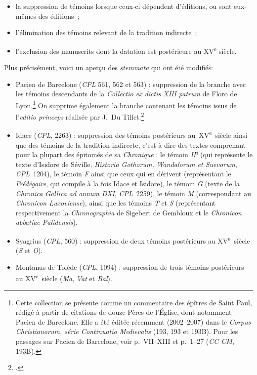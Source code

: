 \documentclass[a4paper,twoside,12pt]{book}
\begin{document}
	\begin{itemize}
		\item la suppression de témoins lorsque ceux-ci dépendent d’éditions, ou sont eux-mêmes des éditions~;
		\item l’élimination des témoins relevant de la tradition indirecte~;
		\item l’exclusion des manuscrits dont la datation est postérieure au XV\textsuperscript{e} siècle. \\
	\end{itemize}
	
	Plus précisément, voici un aperçu des \textit{stemmata} qui ont été modifiés:
	
	\begin{itemize}
		
		\item Pacien de Barcelone (\textit{CPL} 561, 562 et 563) : suppression de la branche avec les témoins descendants de la \textit{Collectio ex dictis XIII patrum} de Floro de Lyon.\footnote{Cette collection se présente comme un commentaire des épîtres de Saint Paul, rédigé à partir de citations de douze Pères de l'Église, dont notamment Pacien de Barcelone. Elle a été éditée récemment (2002--2007) dans le \textit{Corpus Christianorum, série Continuatio Medievalis} (193, 193 et 193B). Pour les passages sur Pacien de Barcelone, voir p.~VII--XIII et p.~1--27 (\textit{CC CM}, 193B).} On supprime également la branche contenant les témoins issus de l’\textit{editio princeps} réalisée par J.~Du Tillet.\footcite{Dutillet}
		
		
		\item Idace (\textit{CPL}, 2263) : suppression des témoins postérieurs au~XV\textsuperscript{e}~siècle ainsi que des témoins de la tradition indirecte, c’est-à-dire des textes comprenant pour la plupart des épitomés de sa \textit{Chronique} : le témoin \textit{IP} (qui représente le texte d’Isidore de Séville, \textit{Historia Gothorum, Wandalorum et Suevorum}, \textit{CPL}~1204), le témoin \textit{F} ainsi que ceux qui en dérivent (représentant le \textit{Frédégaire}, qui compile à la fois Idace et Isidore), le témoin \textit{G} (texte de la \textit{Chronica Gallica ad annum DXI}, \textit{CPL}~2259), le témoin \textit{M} (correspondant au \textit{Chronicon Luxoviense}), ainsi que les témoins \textit{T} et \textit{S} (représentant respectivement la \textit{Chronographia} de Sigebert de Gembloux et le \textit{Chronicon abbatiae Palidensis}).
		
		\item Syagrius (\textit{CPL}, 560) : suppression de deux témoins postérieurs au XV\textsuperscript{e}~siècle (\textit{S} et \textit{O}).
		
		\item Montanus de Tolède  (\textit{CPL}, 1094) : suppression de trois témoins postérieurs au XV\textsuperscript{e}~siècle (\textit{Ma}, \textit{Vat} et \textit{Bal}). %
		
		
		
		
	\end{itemize}
	
\end{document}
